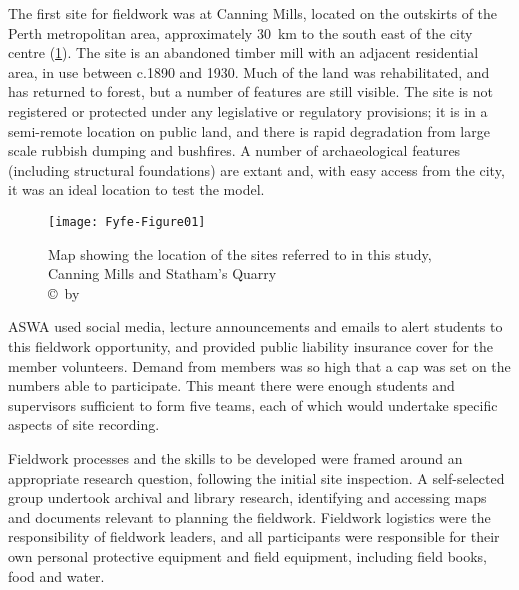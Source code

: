 The first site for fieldwork was at Canning Mills, located on the outskirts of the Perth metropolitan area, approximately \SI {30}{\kilo\meter} 
	to the south east of the city centre (\cref{fig:Fyfe-Figure01}). 
	The site is an abandoned timber mill with an adjacent residential area, in use between c.1890 and 1930. 
	Much of the land was rehabilitated, and has returned to forest, but a number of features are still visible. The site is not registered or protected under any legislative or regulatory provisions; it is in a semi-remote location on public land, and there is rapid degradation from large scale rubbish dumping and bushfires. A number of archaeological features (including structural foundations) are extant and, with easy access from the city, it was an ideal location to test the model.
	
	\begin{figure}[!htb] %
		\texttt{[image: Fyfe-Figure01]}
		\caption{Map showing the location of the sites referred to in this study, Canning Mills and Statham’s Quarry
		{\normalfont\scriptsize \\ \copyright\ by 
				                 \shortauthor
				                  }}
		\centering
		\label{fig:Fyfe-Figure01}
	\end{figure}
ASWA used social media, lecture announcements and emails to alert students to this fieldwork opportunity, and provided public liability insurance cover for the member volunteers. 
	Demand from members was so high that a cap was set on the numbers able to participate. 
	This meant there were enough students and supervisors sufficient to form five teams, each of which would undertake specific aspects of site recording.
	
	Fieldwork processes and the skills to be developed were framed around an appropriate research question, following the initial site inspection. A self-selected group undertook archival and library research, identifying and accessing maps and documents relevant to planning the fieldwork.
	Fieldwork logistics were the responsibility of fieldwork leaders, and all participants were responsible for their own personal protective equipment and field equipment, including field books, food and water.
	
